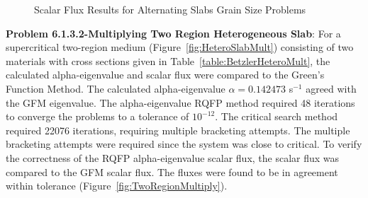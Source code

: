 %
%
\clearpage

\begin{figure}[!htbp]
	\centering
	\resizebox{0.75\textwidth}{!}{
	
	}
	\caption{Scalar Flux Results for Alternating Slabs Grain Size Problems}
	\label{fig:GrainScalarFlux}
\end{figure}

\textbf{Problem 6.1.3.2-Multiplying Two Region Heterogeneous Slab}: For a supercritical two-region medium (Figure~\ref{fig:HeteroSlabMult}) consisting of two materials with cross sections given in Table~\ref{table:BetzlerHeteroMult}, the calculated alpha-eigenvalue and scalar flux were compared to the Green's Function Method. The calculated alpha-eigenvalue $\alpha = 0.142473$ s$^{-1}$ agreed with the GFM eigenvalue. The alpha-eigenvalue RQFP method required 48 iterations to converge the problems to a tolerance of $10^{-12}$. The critical search method required 22076 iterations, requiring multiple bracketing attempts. The multiple bracketing attempts were required since the system was close to critical. To verify the correctness of the RQFP alpha-eigenvalue scalar flux, the scalar flux was compared to the GFM scalar flux. The fluxes were found to be in agreement within tolerance (Figure~\ref{fig:TwoRegionMultiply}).

